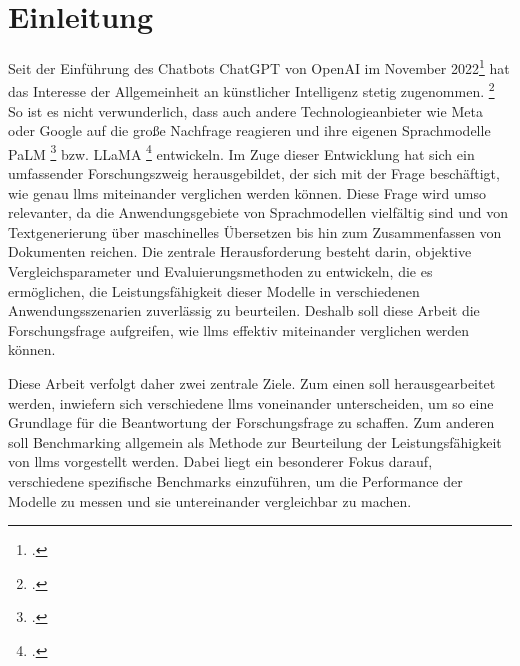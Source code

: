 \section{Einleitung} \label{sec:einleitung}
Seit der Einführung des Chatbots ChatGPT von OpenAI im November 2022\footcite[Vgl.][]{ChatGPT-announcement} hat das Interesse der Allgemeinheit an künstlicher Intelligenz stetig zugenommen. \footcite[Vgl.][]{google_trends_ki}
So ist es nicht verwunderlich, dass auch andere Technologieanbieter wie Meta oder Google auf die große Nachfrage reagieren und ihre eigenen Sprachmodelle PaLM \footcite[Vgl.][S. 1]{anil2023palm} bzw. LLaMA \footcite[Vgl.][S. 1]{touvron2023llama} entwickeln.
Im Zuge dieser Entwicklung hat sich ein umfassender Forschungszweig herausgebildet, der sich mit der Frage beschäftigt, wie genau \acp{llm} miteinander verglichen werden können.
Diese Frage wird umso relevanter, da die Anwendungsgebiete von Sprachmodellen vielfältig sind und von Textgenerierung über maschinelles Übersetzen bis hin zum Zusammenfassen von Dokumenten reichen.
Die zentrale Herausforderung besteht darin, objektive Vergleichsparameter und Evaluierungsmethoden zu entwickeln, die es ermöglichen, die Leistungsfähigkeit dieser Modelle in verschiedenen Anwendungsszenarien zuverlässig zu beurteilen.
Deshalb soll diese Arbeit die Forschungsfrage aufgreifen, wie \acp{llm} effektiv miteinander verglichen werden können.

Diese Arbeit verfolgt daher zwei zentrale Ziele. Zum einen soll herausgearbeitet werden, inwiefern sich verschiedene \acp{llm} voneinander unterscheiden, um so eine Grundlage für die Beantwortung der Forschungsfrage zu schaffen.
Zum anderen soll Benchmarking allgemein als Methode zur Beurteilung der Leistungsfähigkeit von \acp{llm} vorgestellt werden.
Dabei liegt ein besonderer Fokus darauf, verschiedene spezifische Benchmarks einzuführen, um die Performance der Modelle zu messen und sie untereinander vergleichbar zu machen.


